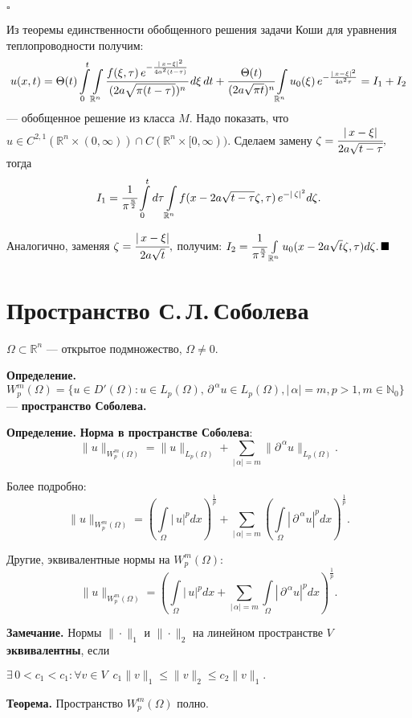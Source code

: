 \documentclass[unicode,12pt,draft]{article}
\begin{document}
$\square$

Из теоремы единственности обобщенного решения задачи Коши для
уравнения теплопроводности получим:
$$u(x,t)=
\Theta(t)\int\limits_0^t \int\limits_{\mathbb R^n}
\cfrac{f(\xi,\tau)\,e^{-\frac{|\,x-\xi|^2}{4a^2(t-\tau)}}}
{(2a\sqrt{\pi(t-\tau)})^n}\,d\xi\,dt+
\cfrac{\Theta(t)}{(2a\sqrt{\pi t})^n} \int\limits_{\mathbb
R^n}u_0(\xi)\,e^{-\frac{|\,x-\xi|^2}{4a^2\tau}}=I_1+I_2$$
--- обобщенное решение из класса $M$. Надо показать, что $u\in C^{2,1}(\mathbb R^n\times(0,\infty))\cap C(\mathbb
R^n\times[0,\infty))$. Сделаем замену
$\zeta=\cfrac{|\,x-\xi|}{2a\sqrt{t-\tau}},$ тогда
$$I_1=\cfrac1{\pi^{\frac n2}}\int\limits_0^t d\tau \int\limits_{\mathbb R^n}
f(x-2a\sqrt{t-\tau}\zeta,\tau)\,e^{-|\,\zeta|^2}d\zeta.$$

Аналогично, заменяя $\zeta=\cfrac{|\,x-\xi|}{2a\sqrt{t}},$
получим: $I_2=\cfrac1{\pi^{\frac n2}} \int\limits_{\mathbb R^n}
u_0(x-2a\sqrt{t}\zeta,\tau)d\zeta.\,\blacksquare$

\section{Пространство С.\,Л.\,Соболева}

$\Omega\subset\mathbb R^{n}$ --- открытое подмножество,
$\Omega\ne0.$

\textbf{Определение.} $W_p^m(\Omega)=\{u\in D'(\Omega)\colon u\in
L_p(\Omega),\,\partial^{\,\alpha} u \in L_p (\Omega),|\,\alpha|=m,
p>1,m\in\mathbb N_0\}$
--- \textbf{пространство Соболева.}

\textbf{Определение.} \textbf{Норма в пространстве Соболева}:
$$\|u\|_{W_p^m(\Omega)}=\|u\|_{L_p(\Omega)}+\sum_{|\,\alpha|=m}
\|\partial^{\,\alpha}u\|_{L_p(\Omega)}.$$

Более подробно:
$$\|u\|_{W_p^m(\Omega)}=\left(\int\limits_{\Omega}|\,u|^p dx\right)^{\frac1p}
+\sum_{|\,\alpha|=m}\left(\int\limits_{\Omega}|\,\partial^{\,\alpha}u|^p
dx\right)^{\frac1p}.$$

Другие, эквивалентные нормы на $W_p^m(\Omega)$:
$$\|u\|_{W_p^m(\Omega)}=\left(\int\limits_{\Omega}|\,u|^p dx
+\sum_{|\,\alpha|=m}\int\limits_{\Omega}|\,\partial^{\,\alpha}u|^p
dx\right)^{\frac1p}.$$

\textbf{Замечание.} Нормы $\|\cdot\|_1$ и $\|\cdot\|_2$ на
линейном пространстве $V$ \textbf{эквивалентны}, если

$\exists \,0<c_1<c_1\colon \forall v\in V\,\,\,
c_1\|v\|_1\le\|v\|_2\le c_2\|v\|_1.$

\textbf{Теорема.} Пространство $W_p^m(\Omega)$ полно.
\end{document}
